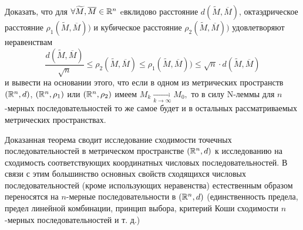 \documentclass[../../main.tex]{subfiles}
\begin{document}
  \begin{exc}
    Доказать, что для $\forall \widetilde M, \overline{M} \in \mathbb{R}^n$ 
    eвклидово расстояние $d(\widetilde M, \overline{M})$, 
    октаэдрическое расстояние $\rho_1(\widetilde M, \overline{M}))$ 
    и кубическое расстояние $\rho_2(\widetilde M, \overline{M}))$ 
    удовлетворяют неравенствам
    \[
    \frac{d(\widetilde M, \overline{M})}{\sqrt{n}} \leq 
    \rho_2(\widetilde M, \overline{M}) \leq \rho_1(\widetilde M, 
    \overline{M})) \leq \sqrt{n}\cdot d(\widetilde M, \overline{M})
    \]
     и вывести на основании этого, что если в одном из метрических 
     пространств $(\mathbb{R}^n, d)$, $(\mathbb{R}^n, \rho_1)$ или $(\mathbb{R}^n, \rho_2)$ 
     имеем $M_k \underset{k\rightarrow\infty}{\longrightarrow}  M_0,$
     то в силу N-леммы для $n$-мерных последовательностей 
     то же самое будет и в остальных рассматриваемых метрических пространствах.
  \end{exc}
  
  \begin{rem}
    Доказанная теорема сводит исследование сходимости точечных 
    последовательностей в метрическом пространстве $(\mathbb{R}^n, d)$ к 
    исследованию на сходимость соответствующих координатных числовых 
    последовательностей.
    В связи с этим большинство основных свойств сходящихся числовых 
    последовательностей (кроме использующих неравенства) естественным
    образом переносятся на $n$-мерные последовательности в $(\mathbb{R}^n, d)$
    (единственность предела, предел линейной комбинации, принцип 
    выбора, критерий Коши сходимости $n$-мерных последовательностей и 
    т. д.)
  \end{rem}
  
\end{document}
